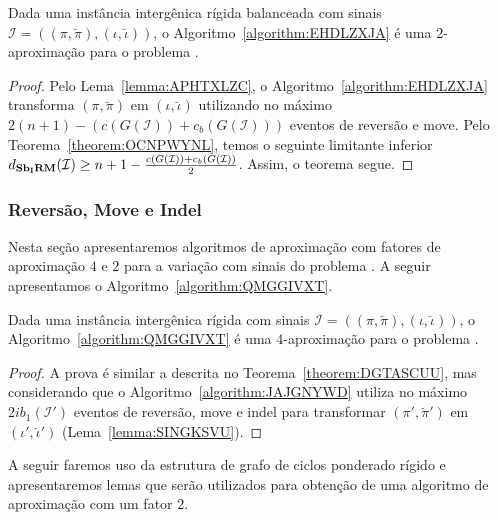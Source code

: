 \begin{theorem}\label{theorem:JYTYUTQA}
Dada uma instância intergênica rígida balanceada com sinais $\mathcal{I}=((\pi,\breve\pi),(\iota,\breve\iota))$, o Algoritmo~\ref{algorithm:EHDLZXJA} é uma $2$-aproximação para o problema \SbIRM{}.
\end{theorem}
\begin{proof}
Pelo Lema~\ref{lemma:APHTXLZC}, o Algoritmo~\ref{algorithm:EHDLZXJA} transforma $(\pi,\breve\pi)$ em $(\iota,\breve\iota)$ utilizando no máximo $2(n + 1) - (c(G(\mathcal{I})) + c_b(G(\mathcal{I})))$ eventos de reversão e move. Pelo Teorema~\ref{theorem:OCNPWYNL}, temos o seguinte limitante inferior $d_{\textbf{Sb\textsubscript{I}RM}}(\mathcal{I}) \ge {n + 1} - \frac{c(G(\mathcal{I})) + c_b(G(\mathcal{I}))}{2}$. Assim, o teorema segue.
\end{proof}

\subsubsection{Reversão, Move e Indel}

Nesta seção apresentaremos algoritmos de aproximação com fatores de aproximação $4$ e $2$ para a variação com sinais do problema \SbIRMI{}. A seguir apresentamos o Algoritmo~\ref{algorithm:QMGGIVXT}.



\begin{theorem}\label{theorem:PZXMHZFE}
Dada uma instância intergênica rígida com sinais $\mathcal{I}=((\pi,\breve\pi),(\iota,\breve\iota))$, o Algoritmo~\ref{algorithm:QMGGIVXT} é uma $4$-aproximação para o problema \SbIRMI{}.
\end{theorem}
\begin{proof}
A prova é similar a descrita no Teorema~\ref{theorem:DGTASCUU}, mas considerando que o Algoritmo~\ref{algorithm:JAJGNYWD} utiliza no máximo $2ib_1(\mathcal{I'})$ eventos de reversão, move e indel para transformar $(\pi',\breve\pi')$ em $(\iota',\breve\iota')$ (Lema~\ref{lemma:SINGKSVU}).
\end{proof}

A seguir faremos uso da estrutura de grafo de ciclos ponderado rígido e apresentaremos lemas que serão utilizados para obtenção de uma algoritmo de aproximação com um fator $2$.


